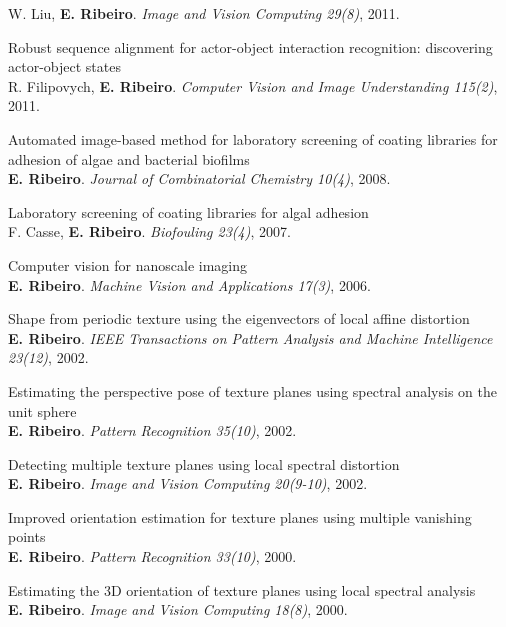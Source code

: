 \documentclass[11pt]{article}
\newcommand{\cvsubsection}[1]{%
  \vspace{6pt}{\normalfont\scshape #1}\par\vspace{3pt}}
\begin{document}
\begin{cvitems}
  W. Liu, \textbf{E. Ribeiro}. \textit{Image and Vision Computing 29(8)}, 2011.
  \item Robust sequence alignment for actor-object interaction recognition: discovering actor-object states\\
  R. Filipovych, \textbf{E. Ribeiro}. \textit{Computer Vision and Image Understanding 115(2)}, 2011.
  \item Automated image-based method for laboratory screening of coating libraries for adhesion of algae and bacterial biofilms\\
  \textbf{E. Ribeiro}. \textit{Journal of Combinatorial Chemistry 10(4)}, 2008.
  \item Laboratory screening of coating libraries for algal adhesion\\
  F. Casse, \textbf{E. Ribeiro}. \textit{Biofouling 23(4)}, 2007.
  \item Computer vision for nanoscale imaging\\
  \textbf{E. Ribeiro}. \textit{Machine Vision and Applications 17(3)}, 2006.
  \item Shape from periodic texture using the eigenvectors of local affine distortion\\
  \textbf{E. Ribeiro}. \textit{IEEE Transactions on Pattern Analysis and Machine Intelligence 23(12)}, 2002.
  \item Estimating the perspective pose of texture planes using spectral analysis on the unit sphere\\
  \textbf{E. Ribeiro}. \textit{Pattern Recognition 35(10)}, 2002.
  \item Detecting multiple texture planes using local spectral distortion\\
  \textbf{E. Ribeiro}. \textit{Image and Vision Computing 20(9-10)}, 2002.
  \item Improved orientation estimation for texture planes using multiple vanishing points\\
  \textbf{E. Ribeiro}. \textit{Pattern Recognition 33(10)}, 2000.
  \item Estimating the 3D orientation of texture planes using local spectral analysis\\
  \textbf{E. Ribeiro}. \textit{Image and Vision Computing 18(8)}, 2000.
\end{cvitems}
\cvsubsection{Peer-Reviewed Conferences and Workshops}
\end{document}
